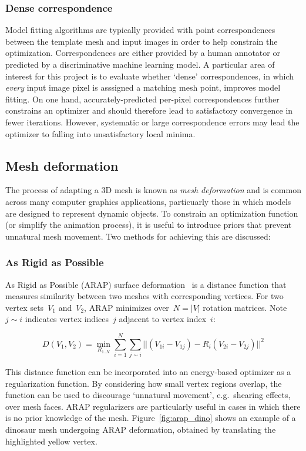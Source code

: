     \subsubsection{Dense correspondence}
    Model fitting algorithms are typically provided with point correspondences between the template mesh and input images in order to help constrain the optimization. Correspondences are either provided by a human annotator or predicted by a discriminative machine learning model. A particular area of interest for this project is to evaluate whether `dense' correspondences, in which \emph{every} input image pixel is asssigned a matching mesh point, improves model fitting. On one hand, accurately-predicted per-pixel correspondences further constrains an optimizer and should therefore lead to satisfactory convergence in fewer iterations. However, systematic or large correspondence errors may lead the optimizer to falling into unsatisfactory local minima.
    
    \subsection{Mesh deformation}
    The process of adapting a 3D mesh is known as \textit{mesh deformation} and is common across many computer graphics applications, particuarly those in which models are designed to represent dynamic objects. To constrain an optimization function (or simplify the animation process), it is useful to introduce priors that prevent unnatural mesh movement. Two methods for achieving this are discussed:

    \subsubsection{As Rigid as Possible}
        As Rigid as Possible (ARAP) surface deformation~\cite{sorkine2007rigid} is a distance function that measures similarity between two meshes with corresponding vertices. For two vertex sets~$V_{1}$ and~$V_{2}$, ARAP minimizes over~$N = |V|$ rotation matrices. Note~$j \sim i$ indicates vertex indices~$j$ adjacent to vertex index~$i$:

        \begin{equation}
            D(V_{1}, V_{2}) = \min_{R_{1..N}}\sum_{i=1}^{N}\sum_{j \sim i}|| (V_{1i} - V_{1j}) - R_{i}(V_{2i} - V_{2j}) ||^{2}
        \end{equation}

        This distance function can be incorporated into an energy-based optimizer as a regularization function. By considering how small vertex regions overlap, the function can be used to  discourage `unnatural movement', e.g.\ shearing effects, over mesh faces. ARAP regularizers are particularly useful in cases in which there is no prior knowledge of the mesh. Figure~\ref{fig:arap_dino} shows an example of a dinosaur mesh undergoing ARAP deformation, obtained by translating the highlighted yellow vertex.

